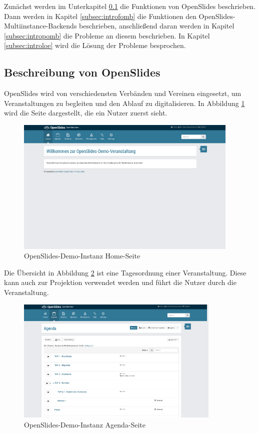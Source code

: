 \documentclass[11pt,a4paper]{article}
\begin{document}
Zunächst werden im Unterkapitel \ref{subsec:introfo} die Funktionen von 
OpenSlides beschrieben. Dann werden in Kapitel \ref{subsec:introfomb} die 
Funktionen den OpenSlides-Multiinstance-Backends beschrieben, anschließend 
daran werden in Kapitel \ref{subsec:intropomb} die Probleme an diesem 
beschrieben. In Kapitel \ref{subsec:introloe} wird die Lösung der Probleme 
besprochen.
\subsection{Beschreibung von OpenSlides}
\label{subsec:introfo}
OpenSlides wird von verschiedensten Verbänden und Vereinen eingesetzt, um 
Veranstaltungen zu begleiten und den Ablauf zu digitalisieren. In Abbildung 
\ref{fig:osdemohome} wird die Seite dargestellt, die ein Nutzer zuerst sieht.
\begin{figure}[htp]
	\centering
	\includegraphics[width=0.95\textwidth]{img/openslides_home_page.png}
	\caption[OpenSlides-Demo-Instanz \glqq{}Home\grqq{}-Seite
	\cite{osdemo}]{OpenSlides-Demo-Instanz \glqq{}Home\grqq{}-Seite 
		\cite{osdemo}}
	\label{fig:osdemohome}
\end{figure}
\newpage
Die Übersicht in Abbildung \ref{fig:osdemoagenda} ist eine Tagesordnung einer 
Veranstaltung. Diese kann auch zur Projektion verwendet werden und führt die 
Nutzer durch die Veranstaltung.
\begin{figure}[htp]
	\centering
	\includegraphics[width=0.87\textwidth]{img/openslides_agenda_page.png}
	\caption[OpenSlides-Demo-Instanz \glqq{}Agenda\grqq{}-Seite
	\cite{osdemo}]{OpenSlides-Demo-Instanz \glqq{}Agenda\grqq{}-Seite 
		\cite{osdemo}}
	\label{fig:osdemoagenda}
\end{figure}
\end{document}
